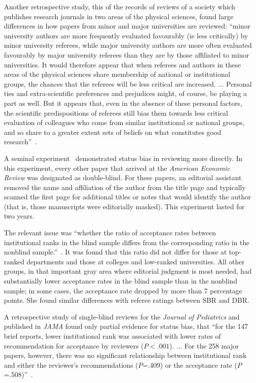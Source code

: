 \documentclass[acmtods,acmnow]{acmtrans2m}
\begin{document}
Another retrospective study, this of the records of reviews of a society
which publishes research journals in two areas of the physical sciences,
found large differences in how papers from minor and major universities are
reviewed: ``minor university authors are more frequently evaluated
favourably (ie less critically) by minor university referees, while major
university authors are more often evaluated favourably by major university
referees than they are by those affiliated to minor universities. It would
therefore appear that when referees and authors in these areas of the
physical sciences share membership of national or institutional groups, the
chances that the referees will be less critical are increased. ... Personal
ties and extra-scientific preferences and prejudices might, of course, be
playing a part as well. But it appears that, even in the absence of these
personal factors, the scientific predispositions of referees still bias them
towards less critical evaluation of colleagues who come from similar
institutional or national groups, and so share to a greater extent sets of
beliefs on what constitutes good research''~\cite[pp.~274--5]{gordon80}.

A seminal experiment~\cite{blank91} demonstrated status bias in reviewing
more directly.  In this experiment, every other paper that arrived at the
{\em American Economic Review} was designated as double-blind. For these
papers, an editorial assistant removed the name and affiliation of the
author from the title page and typically scanned the first page for
additional titles or notes that would identify the author (that is, those
manuscripts were editorially masked). This experiment lasted for two years.

The relevant issue was ``whether the ratio of acceptance rates between
institutional ranks in the blind sample differs from the corresponding ratio
in the nonblind sample.''~\cite[page~1053--1054]{blank91}. It was found that
this ratio did not differ for those at top-ranked departments and those at
colleges and low-ranked universities. All other groups, in that important
gray area where editorial judgment is most needed, had substantially lower
acceptance rates in the blind sample than in the nonblind sample; in some
cases, the acceptance rate dropped by more than 7 percentage points.  She
found similar differences with referee ratings between SBR and DBR.

A retrospective study of single-blind
reviews for the {\em Journal of Pediatrics} and published in {\em JAMA}
found only partial evidence for status bias, that ``for the 147 brief reports, lower institutional rank was
associated with lower rates of recommendation for acceptance by reviewers
($P<.001$). ... For the 258 major papers, however, there was no significant
relationship between institutional rank and either the reviewer's
recommendations ($P$=.409) or the acceptance rate ($P$=.508)''~\cite[page
138]{garfunkel94}.
\end{document}
